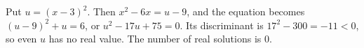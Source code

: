 Put $u=(x-3)^2$. Then $x^2-6x=u-9$, and the equation becomes $(u-9)^2+u=6$, or $u^2-17u+75=0$. Its discriminant is $17^2-300=-11<0$, so even $u$ has no real value. The number of real solutions is $\boxed0$.
